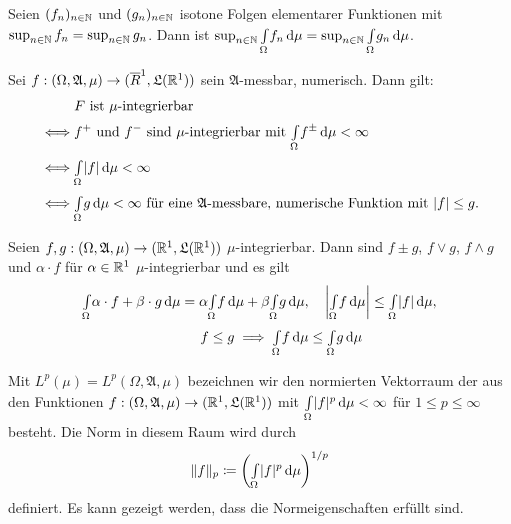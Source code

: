 \documentclass{cheat-sheet}
\newcommand{\Alg}{\mathfrak{A}}
\newcommand{\LebAlg}{\mathfrak{L}} %
\begin{document}
\begin{satz}
  Seien $(f_n)_{n \in \mathbb{N}}$ und $(g_n)_{n \in \mathbb{N}}$ isotone Folgen elementarer Funktionen mit $\sup_{n \in \mathbb{N}} f_n = \sup_{n \in \mathbb{N}} g_n$. Dann ist $\sup_{n \in \mathbb{N}} {\textstyle \int\limits_{\Omega}^{}} f_n \,\mathrm{d} \mu = \sup_{n \in \mathbb{N}} {\textstyle \int\limits_{\Omega}^{}} g_n \,\mathrm{d} \mu$.
\end{satz}



\begin{satz}
  Sei $f : (\Omega, \Alg, \mu) \to (\overline{R}^1, \LebAlg(\R^1))$ sein $\Alg$-messbar, numerisch. Dann gilt:
  \begin{align*}
    & \text{$F$ ist $\mu$-integrierbar} \\
    \iff & \text{$f^+$ und $f^-$ sind $\mu$-integrierbar mit $\Int{\Omega}{}{f^{\pm}}{\mu} < \infty$} \\
    \iff & \Int{\Omega}{}{|f|}{\mu} < \infty \\
    \iff & \Int{\Omega}{}{g}{\mu} < \infty \text{ für eine $\Alg$-messbare, numerische Funktion mit $|f| \leq g$}.
  \end{align*}
\end{satz}

\begin{satz}
  Seien $f, g : (\Omega, \Alg, \mu) \to (\R^1, \LebAlg(\R^1))$ $\mu$-integrierbar. Dann sind $f \pm g$, $f \vee g$, $f \wedge g$ und $\alpha \cdot f$ für $\alpha \in \mathbb{R}^1$ $\mu$-integrierbar und es gilt
  \begin{align*}
    {\textstyle \int\limits_{\Omega}^{}} \alpha \cdot f + \beta \cdot g \,\mathrm{d} \mu = \alpha {\textstyle \int\limits_{\Omega}^{}} f \,\mathrm{d} \mu + \beta {\textstyle \int\limits_{\Omega}^{}} g \,\mathrm{d} \mu, & \quad
    \left| {\textstyle \int\limits_{\Omega}^{}} f \,\mathrm{d} \mu \right| \leq {\textstyle \int\limits_{\Omega}^{}} |f| \,\mathrm{d} \mu, \\
    f \leq g \implies {\textstyle \int\limits_{\Omega}^{}} f \,\mathrm{d} \mu &\leq {\textstyle \int\limits_{\Omega}^{}} g \,\mathrm{d} \mu
  \end{align*}
\end{satz}

\begin{defn}
  Mit $L^p(\mu) = L^p(\Omega, \Alg, \mu)$ bezeichnen wir den normierten Vektorraum der aus den Funktionen $f : (\Omega, \Alg, \mu) \to (\R^1, \LebAlg(\R^1))$ mit ${\textstyle \int\limits_{\Omega}^{}} |f|^p \,\mathrm{d} \mu < \infty$ für $1 \leq p \leq \infty$ besteht. Die Norm in diesem Raum wird durch
  \[ \|f\|_p \coloneqq \left( {\textstyle \int\limits_{\Omega}^{}} |f|^p \,\mathrm{d} \mu \right)^{1/p} \]
  definiert. Es kann gezeigt werden, dass die Normeigenschaften erfüllt sind.
\end{defn}
\end{document}
